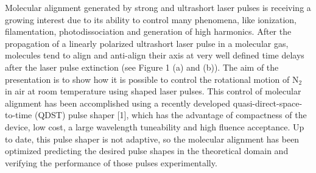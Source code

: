 Molecular alignment generated by strong and ultrashort laser pulses is
receiving a growing interest due to its ability to control many phenomena, like
ionization, filamentation, photodissociation and generation of high harmonics. After
the propagation of a linearly polarized ultrashort laser pulse in a molecular gas,
molecules tend to align and anti-align their axis at very well defined time delays after
the laser pulse extinction (see Figure 1 (a) and (b)). The aim of the presentation is to
show how it is possible to control the rotational motion of N$_{2}$ in air at room
temperature using shaped laser pulses. This control of molecular alignment has been
accomplished using a recently developed quasi-direct-space-to-time (QDST) pulse
shaper [1], which has the advantage of compactness of the device, low cost, a large
wavelength tuneability and high fluence acceptance. Up to date, this pulse shaper is
not adaptive, so the molecular alignment has been optimized predicting the desired
pulse shapes in the theoretical domain and verifying the performance of those pulses
experimentally.

